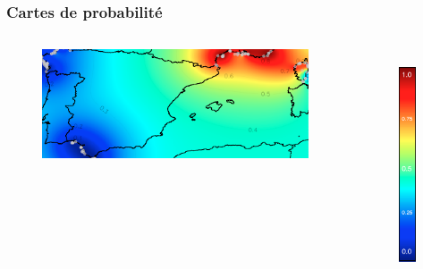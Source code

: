 \documentclass[10pt,xcolor=table]{beamer}\usepackage[]{graphicx}\usepackage[]{color}
\begin{document}
\begin{frame}
	\frametitle{Cartes de probabilité}
	\begin{columns}
	\begin{column}{0.5\textwidth}
	\begin{figure}
		\begin{center}
		\includegraphics[width=8cm]{mno}
		\end{center}
	\end{figure}
	\end{column}
	\begin{column}{0.5\textwidth}
		\begin{figure}
			\begin{center}
			\hspace*{2cm}~\includegraphics[width=0.5cm]{scale}
			\end{center}
		\end{figure}
		\end{column}
	\end{columns}
\end{frame}
\end{document}
